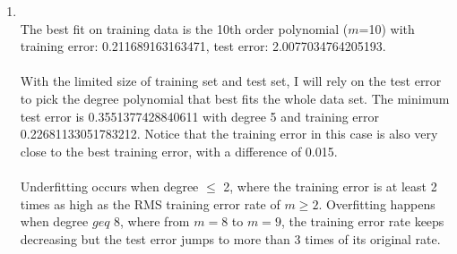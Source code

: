 \documentclass[11pt]{article}
\begin{document}
\begin{enumerate}[label=(\alph*)]
\item
    \\
    The best fit on training data is the 10th order polynomial ($m$=10) with training error: 0.211689163163471, test error: 2.0077034764205193. \\\\
    With the limited size of training set and test set, I will rely on the test error to pick the degree polynomial that best fits the whole data set. The minimum test error is 0.3551377428840611 with degree 5 and training error 0.22681133051783212. Notice that the training error in this case is also very close to the best training error, with a difference of 0.015.\\\\
    Underfitting occurs when degree $\leq$ 2, where the training error is at least 2 times as high as the RMS training error rate of $m \geq 2$. Overfitting happens when degree $geq$ 8, where from $m = 8$ to $m = 9$, the training error rate keeps decreasing but the test error jumps to more than 3 times of its original rate.

\end{enumerate}
\newpage
\end{document}
